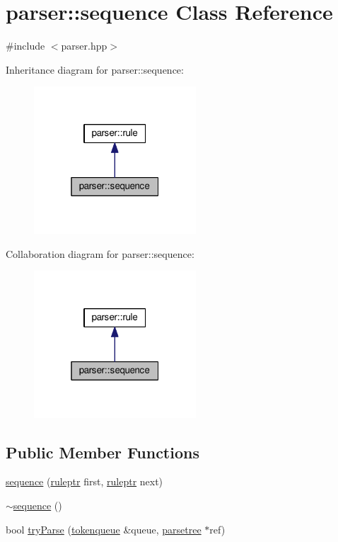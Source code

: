 \hypertarget{classparser_1_1sequence}{}\section{parser\+:\+:sequence Class Reference}
\label{classparser_1_1sequence}


{\ttfamily \#include $<$parser.\+hpp$>$}



Inheritance diagram for parser\+:\+:sequence\+:\nopagebreak
\begin{figure}[H]
\begin{center}
\leavevmode
\includegraphics[width=172pt]{classparser_1_1sequence__inherit__graph}
\end{center}
\end{figure}


Collaboration diagram for parser\+:\+:sequence\+:\nopagebreak
\begin{figure}[H]
\begin{center}
\leavevmode
\includegraphics[width=172pt]{classparser_1_1sequence__coll__graph}
\end{center}
\end{figure}
\subsection*{Public Member Functions}
\begin{DoxyCompactItemize}
\item 
\hyperlink{classparser_1_1sequence_a360c88bf21abc2066043c03735b5341f}{sequence} (\hyperlink{namespaceparser_a85b2df48287fddaca144a5f6c01b4761}{ruleptr} first, \hyperlink{namespaceparser_a85b2df48287fddaca144a5f6c01b4761}{ruleptr} next)
\item 
\hyperlink{classparser_1_1sequence_ac7681fd304c236f9667f48d6d53ffee7}{$\sim$sequence} ()
\item 
bool \hyperlink{classparser_1_1sequence_a499005d2dd4a3f39985d2deddb413cea}{try\+Parse} (\hyperlink{classparser_1_1tokenqueue}{tokenqueue} \&queue, \hyperlink{structparser_1_1parsetree}{parsetree} $\ast$ref)
\end{DoxyCompactItemize}
